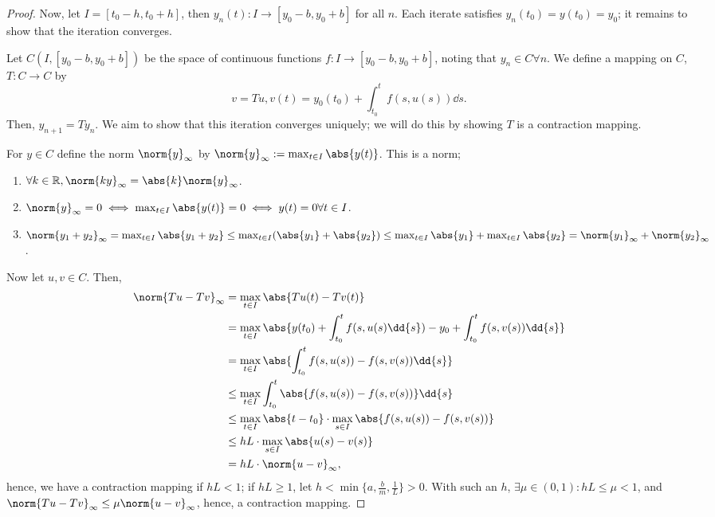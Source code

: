 \begin{proof}
    Now, let $I = [t_0 - h, t_0 + h]$, then $y_n(t) : I \to [y_0 - b, y_0 + b]$ for all $n$. Each iterate satisfies $y_n(t_0) = y(t_0) = y_0$; it remains to show that the iteration converges.

    Let $C(I, [y_0 - b, y_0 + b])$ be the space of continuous functions $f: I \to [y_0 - b, y_0 + b]$, noting that $y_n \in C \forall n$. We define a mapping on $C$, $T: C \to C$ by \[
    v = Tu, v(t) = y_0(t_0) + \int_{t_0}^t f(s, u(s)) \dd{s}.
    \]
    Then, $y_{n+1} = T y_n$. We aim to show that this iteration converges uniquely; we will do this by showing $T$ is a contraction mapping.

    For $y \in C$ define the norm $\norm{y}_\infty$ by $\norm{y}_\infty := \max_{t \in I} \abs{y(t)}$. This is a norm;
    \begin{enumerate}
        \item $\forall k \in \mathbb{R}, \norm{k y}_\infty = \abs{k} \norm{y}_\infty$.
        \item $\norm{y}_\infty = 0 \iff \max_{t \in I} \abs{y(t)} = 0 \iff y(t) = 0 \forall t \in I$.
        \item $\norm{y_1 + y_2}_\infty = \max_{t \in I} \abs{y_1 + y_2} \leq \max_{t \in I}(\abs{y_1} + \abs{y_2}) \leq \max_{t \in I} \abs{y_1} + \max_{t \in I} \abs{y_2} = \norm{y_1}_\infty + \norm{y_2}_\infty$. 
    \end{enumerate}

    Now let $u, v \in C$. Then, \begin{align*}
        \norm{Tu - Tv}_\infty &= \max_{t \in I} \abs{Tu(t) - Tv(t)}\\
        &= \max_{t \in I} \abs{y(t_0) + \int_{t_0}^t f(s, u(s) \dd{s}) - y_0 + \int_{t_0}^t f(s, v(s)) \dd{s}}\\
        &= \max_{t \in I} \abs{\int_{t_0}^t f(s, u(s)) - f(s, v(s)) \dd{s}}\\
        &\leq \max_{t \in I} \int_{t_0}^t \abs{f(s, u(s)) - f(s, v(s))} \dd{s}\\
        & \leq \max_{t \in I} \abs{t - t_0} \cdot \max_{s \in I}\abs{f(s, u(s)) - f(s, v(s))}\\
        &\leq h L \cdot\max_{s \in I} \abs{u(s) - v(s)}\\
        &= hL \cdot \norm{u-v}_\infty,
    \end{align*}
    hence, we have a contraction mapping if $hL < 1$; if $hL \geq 1$, let $h < \min\{a, \frac{b}{m}, \frac{1}{L}\} > 0$. With such an $h$, $\exists \mu \in (0, 1) : hL \leq \mu < 1$, and $\norm{Tu-Tv}_\infty \leq\mu\norm{u -v}_\infty$, hence, a contraction mapping.


\end{proof}
